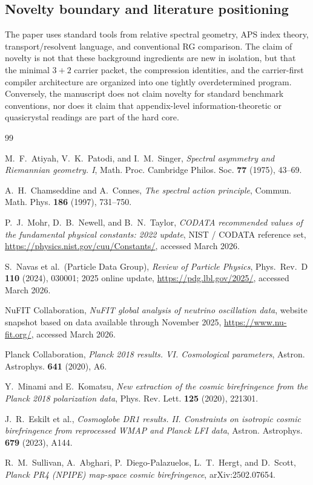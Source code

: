 \documentclass[11pt,a4paper]{article}
\theoremstyle{definition}
\theoremstyle{remark}
\begin{document}
\subsection{Novelty boundary and literature positioning}

The paper uses standard tools from relative spectral geometry, APS index theory, transport/resolvent language, and conventional RG comparison. The claim of novelty is not that these background ingredients are new in isolation, but that the minimal $3+2$ carrier packet, the compression identities, and the carrier-first compiler architecture are organized into one tightly overdetermined program. Conversely, the manuscript does not claim novelty for standard benchmark conventions, nor does it claim that appendix-level information-theoretic or quasicrystal readings are part of the hard core.

\begin{thebibliography}{99}

M.~F.~Atiyah, V.~K.~Patodi, and I.~M.~Singer,
\newblock \emph{Spectral asymmetry and Riemannian geometry. I},
\newblock Math. Proc. Cambridge Philos. Soc. \textbf{77} (1975), 43--69.

A.~H.~Chamseddine and A.~Connes,
\newblock \emph{The spectral action principle},
\newblock Commun. Math. Phys. \textbf{186} (1997), 731--750.

P.~J.~Mohr, D.~B.~Newell, and B.~N.~Taylor,
\newblock \emph{CODATA recommended values of the fundamental physical constants: 2022 update},
\newblock NIST / CODATA reference set, \url{https://physics.nist.gov/cuu/Constants/}, accessed March 2026.

S.~Navas et al.\ (Particle Data Group),
\newblock \emph{Review of Particle Physics},
\newblock Phys.\ Rev.\ D \textbf{110} (2024), 030001; 2025 online update, \url{https://pdg.lbl.gov/2025/}, accessed March 2026.

NuFIT Collaboration,
\newblock \emph{NuFIT global analysis of neutrino oscillation data},
\newblock website snapshot based on data available through November 2025, \url{https://www.nu-fit.org/}, accessed March 2026.

Planck Collaboration,
\newblock \emph{Planck 2018 results. VI. Cosmological parameters},
\newblock Astron. Astrophys. \textbf{641} (2020), A6.

Y.~Minami and E.~Komatsu,
\newblock \emph{New extraction of the cosmic birefringence from the Planck 2018 polarization data},
\newblock Phys. Rev. Lett. \textbf{125} (2020), 221301.

J.~R.~Eskilt et al.,
\newblock \emph{Cosmoglobe DR1 results. II. Constraints on isotropic cosmic birefringence from reprocessed WMAP and Planck LFI data},
\newblock Astron. Astrophys. \textbf{679} (2023), A144.

R.~M.~Sullivan, A.~Abghari, P.~Diego-Palazuelos, L.~T.~Hergt, and D.~Scott,
\newblock \emph{Planck PR4 (NPIPE) map-space cosmic birefringence},
\newblock arXiv:2502.07654.

\end{thebibliography}
\end{document}
